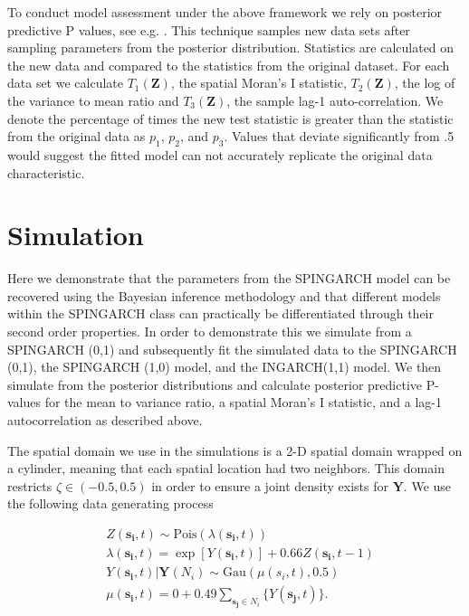 \documentclass[11pt]{isuthesis}
\begin{document}
To conduct model assessment under the above framework we rely on posterior predictive P values, see e.g. \cite{gelman1996posterior}.  This technique samples new data sets after sampling parameters from the posterior distribution.  Statistics are calculated on the new data and compared to the statistics from the original dataset.  For each data set we calculate $T_1(\boldsymbol{Z})$, the spatial Moran's I statistic, $T_2(\boldsymbol{Z})$, the log of the variance to mean ratio and $T_3(\boldsymbol{Z})$, the sample lag-1 auto-correlation.  We denote the percentage of times the new test statistic is greater than the statistic from the original data as $p_1$, $p_2$, and $p_3$.  Values that deviate significantly from .5 would suggest the fitted model can not accurately replicate the original data characteristic.

\section{Simulation}\label{Sec:Sim}

Here we demonstrate that the parameters from the SPINGARCH model can be recovered using the Bayesian inference methodology and that different models within the SPINGARCH class can practically be differentiated through their second order properties.  In order to demonstrate this we simulate from a SPINGARCH (0,1) and subsequently fit the simulated data to the SPINGARCH (0,1), the SPINGARCH (1,0) model, and the INGARCH(1,1) model.  We then simulate from the posterior distributions and calculate posterior predictive P-values for the mean to variance ratio, a spatial Moran's I statistic, and a lag-1 autocorrelation as described above.

The spatial domain we use in the simulations is a 2-D spatial domain wrapped on a cylinder, meaning that each spatial location had two neighbors.  This domain restricts $\zeta \in (-0.5,0.5)$ in order to ensure a joint density exists for $\boldsymbol{Y}$.  We use the following data generating process

\begin{align}
	& Z(\boldsymbol{s_i},t)  \sim\mbox{Pois}(\lambda(\boldsymbol{s_i},t))\nonumber\\
	& \lambda(\boldsymbol{s_i},t) =\exp \left[ Y(\boldsymbol{s_i},t) \right] + 0.66 Z(\boldsymbol{s_i},t-1)\nonumber\\
	& Y(\boldsymbol{s_i},t)|\boldsymbol{Y}(N_i)  \sim \mbox{Gau}(\mu(s_i,t),0.5)\nonumber\\ 
	& \mu(\boldsymbol{s_i},t)  = 0+ 0.49 \sum_{\boldsymbol{s_j} \in N_i} \{Y(\boldsymbol{s_j},t)\}\label{eq:SEPoissonGen}.
\end{align}
\end{document}
